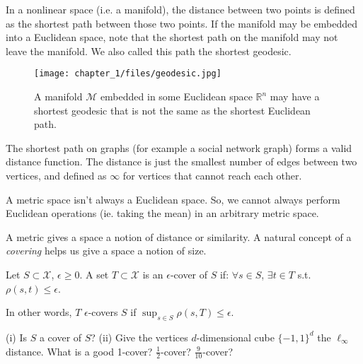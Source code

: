 \begin{example}[Geodesics] In a nonlinear space (i.e. a manifold),
the distance between two points is defined as the shortest path
between those two points. If the manifold may be embedded into a
Euclidean space, note that the shortest path on the manifold may
not leave the manifold. We also called this path the shortest 
geodesic.
\end{example}
\begin{figure}
    \centering
    \captionsetup{width=0.8\textwidth}
    \texttt{[image: chapter\_1/files/geodesic.jpg]}
    \caption{A manifold $\mathcal{M}$ embedded in some Euclidean
    space $\mathbb{R}^n$ may have a shortest geodesic that is
    not the same as the shortest Euclidean path.}
    \label{fig:geodesic}
\end{figure}
\begin{example} The shortest path on graphs (for 
example a social network graph) forms a valid distance function. The
distance is just the smallest number of edges between two vertices, 
and defined as $\infty$ for vertices that cannot reach each other.
\end{example}
\begin{remark}
A metric space isn't always a Euclidean space. So, we cannot always
perform Euclidean operations (ie. taking the mean) in an arbitrary
metric space.
\end{remark}

A metric gives a space a notion of distance or similarity. A natural
concept of a \emph{covering} helps us give a space a notion of size.

\begin{definition}[Cover]
Let $S \subset \mathcal{X}$, $\epsilon \geq 0$. A set $T \subset
\mathcal{X}$ is an $\epsilon$-cover of $S$ if:  $\forall s \in S$,
$\exists t \in T$ s.t. $\rho(s,t) \le \epsilon$.
\end{definition}

In other words, $T$ $\epsilon$-covers $S$ if $\sup_{s\in S} 
\rho(s,T)\leq \epsilon$.

\begin{exercise}
(i) Is $S$ a cover of $S$? (ii) Give the vertices $d$-dimensional
cube $\{-1,1\}^d$ the $\ell_\infty$ distance. What is a good 1-cover?
$\frac{1}{2}$-cover? $\frac{9}{10}$-cover?
\end{exercise}

